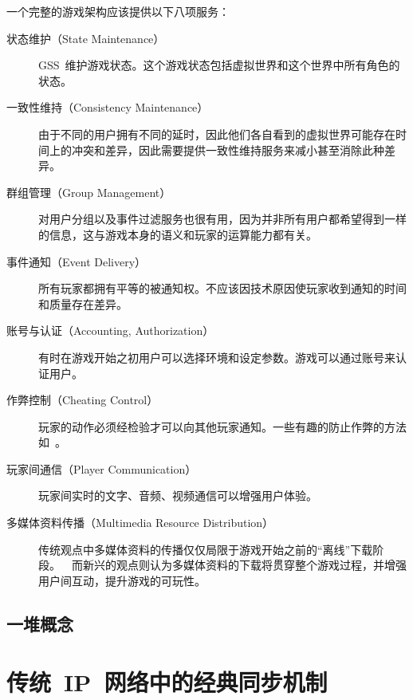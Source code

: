 一个完整的游戏架构应该提供以下八项服务：\cite{openping, dsl}

\begin{description}
\item[状态维护（State Maintenance）]
GSS~维护游戏状态。这个游戏状态包括虚拟世界和这个世界中所有角色的状态。

\item[一致性维持（Consistency Maintenance）]
由于不同的用户拥有不同的延时，因此他们各自看到的虚拟世界可能存在时间上的冲突和差异，因此需要提供一致性维持服务来减小甚至消除此种差异。

\item[群组管理（Group Management）]
对用户分组以及事件过滤服务也很有用，因为并非所有用户都希望得到一样的信息，这与游戏本身的语义和玩家的运算能力都有关。

\item[事件通知（Event Delivery）]
所有玩家都拥有平等的被通知权。不应该因技术原因使玩家收到通知的时间和质量存在差异。

\item[账号与认证（Accounting, Authorization）]
有时在游戏开始之初用户可以选择环境和设定参数。游戏可以通过账号来认证用户。

\item[作弊控制（Cheating Control）]
玩家的动作必须经检验才可以向其他玩家通知。一些有趣的防止作弊的方法如~\cite{cheat1, cheat2, cheat3, cheat4}。

\item[玩家间通信（Player Communication）]
玩家间实时的文字、音频、视频通信可以增强用户体验。

\item[多媒体资料传播（Multimedia Resource Distribution）]
传统观点中多媒体资料的传播仅仅局限于游戏开始之前的“离线”下载阶段。~\cite{traditional}~而新兴的观点则认为多媒体资料的下载将贯穿整个游戏过程，并增强用户间互动，提升游戏的可玩性。~\cite{modern1, modern2, modern3}
\end{description}

\subsection{一堆概念}
\label{def}


\section{传统~IP~网络中的经典同步机制}
\label{traditional}

